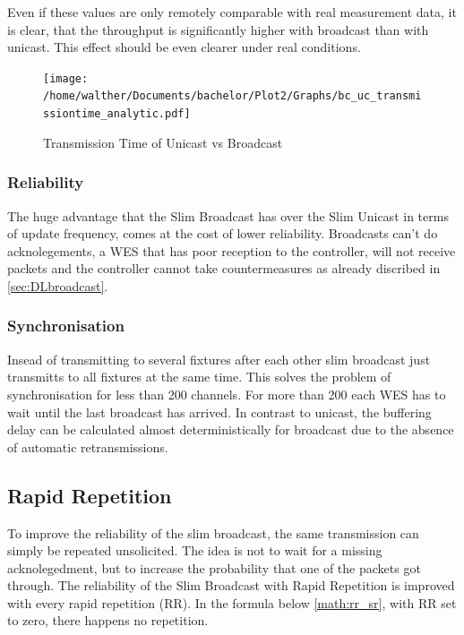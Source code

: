 Even if these values are only remotely comparable with real measurement data, it is clear,
that the throughput is significantly higher with broadcast than with unicast.
This effect should be even clearer under real conditions.

\begin{figure}[h]
	\centering
	\texttt{[image: /home/walther/Documents/bachelor/Plot2/Graphs/bc\_uc\_transmissiontime\_analytic.pdf]}
	\caption{Transmission Time of Unicast vs Broadcast}
	\label{fig:bc_uc_transmissiontime_analytic}
\end{figure}

\subsubsection*{Reliability}

The huge advantage that the Slim Broadcast has over the Slim Unicast in terms of update frequency,
comes at the cost of lower reliability.
Broadcasts can't do acknolegements,
a WES that has poor reception to the controller, will not receive packets and the controller cannot take countermeasures
as already discribed in \cref{sec:DLbroadcast}.

\subsubsection*{Synchronisation}
Insead of transmitting to several fixtures after each other slim broadcast just transmitts to all fixtures at the same time.
This solves the problem of synchronisation for less than 200 channels.
For more than 200 each WES has to wait until the last broadcast has arrived.
In contrast to unicast, the buffering delay can be calculated almost deterministically for broadcast 
due to the absence of automatic retransmissions.

\subsection*{Rapid Repetition}


To improve the reliability of the slim broadcast, the same transmission can simply be repeated unsolicited.
The idea is not to wait for a missing acknolegedment, but to increase the probability that one of the packets got through.
The reliability of the Slim Broadcast with Rapid Repetition is improved with every rapid repetition (RR).
In the formula below \cref{math:rr_sr}, with RR set to zero, there happens no repetition.

